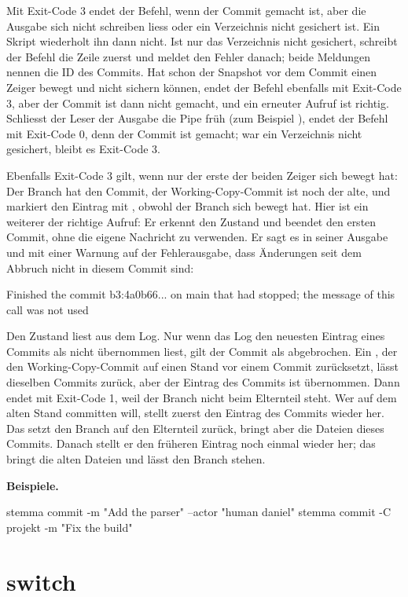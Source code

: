 Mit Exit-Code 3 endet der Befehl, wenn der Commit gemacht ist,
aber die Ausgabe sich nicht schreiben liess oder ein Verzeichnis nicht gesichert ist.
Ein Skript wiederholt ihn dann nicht.
Ist nur das Verzeichnis nicht gesichert, schreibt der Befehl die Zeile zuerst
und meldet den Fehler danach; beide Meldungen nennen die ID des Commits.
Hat schon der Snapshot vor dem Commit einen Zeiger bewegt und nicht sichern können,
endet der Befehl ebenfalls mit Exit-Code 3, aber der Commit ist dann nicht gemacht,
und ein erneuter Aufruf ist richtig.
Schliesst der Leser der Ausgabe die Pipe früh (zum Beispiel ),
endet der Befehl mit Exit-Code 0, denn der Commit ist gemacht;
war ein Verzeichnis nicht gesichert, bleibt es Exit-Code 3.

Ebenfalls Exit-Code 3 gilt, wenn nur der erste der beiden Zeiger sich bewegt hat:
Der Branch hat den Commit, der Working-Copy-Commit ist noch der alte,
und  markiert den Eintrag mit \type{!}, obwohl der Branch sich bewegt hat.
Hier ist ein weiterer  der richtige Aufruf:
Er erkennt den Zustand und beendet den ersten Commit, ohne die eigene Nachricht zu verwenden.
Er sagt es in seiner Ausgabe und mit einer Warnung auf der Fehlerausgabe,
dass Änderungen seit dem Abbruch nicht in diesem Commit sind:

\starttyping
Finished the commit b3:4a0b66... on main that had stopped; the message of this call was not used
\stoptyping

Den Zustand liest  aus dem Log.
Nur wenn das Log den neuesten Eintrag eines Commits als nicht übernommen liest,
gilt der Commit als abgebrochen.
Ein , der den Working-Copy-Commit auf einen Stand vor einem Commit zurücksetzt,
lässt dieselben Commits zurück, aber der Eintrag des Commits ist übernommen.
Dann endet  mit Exit-Code 1, weil der Branch nicht beim Elternteil steht.
Wer auf dem alten Stand committen will, stellt zuerst den Eintrag des Commits wieder her.
Das setzt den Branch auf den Elternteil zurück, bringt aber die Dateien dieses Commits.
Danach stellt er den früheren Eintrag noch einmal wieder her;
das bringt die alten Dateien und lässt den Branch stehen.

{\bf Beispiele.}

\starttyping
stemma commit -m "Add the parser" --actor "human daniel"
stemma commit -C projekt -m "Fix the build"
\stoptyping

\section{switch}

